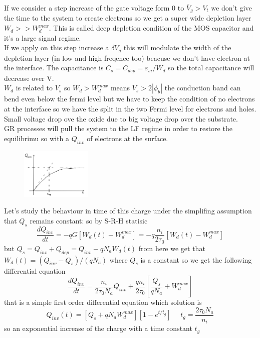 If we consider a step increase of the gate voltage form 0 to $\overline{V}_g>V_t$ we don't give the time to the system to create electrons so we get a super wide depletion layer $W_d>>W_d^{max}$. This is called deep depletion condition of the MOS capacitor and it's a large signal regime.\\
If we apply on this step increase a $\delta V_g$ this will modulate the width of the depletion layer (in low and high freqence too) beacuse we don't have electron at the interface. The capacitance is $C_s=C_{dep}=\varepsilon_{si}/W_d$ so the total capacitance will decrease over V.\\
$W_d$ is related to $V_s$ so $W_d>W_d^{max}$ means $V_s>2|\phi_b|$ the conduction band can bend even below the fermi level but we have to keep the condition of no electrons at the interface so we have the split in the two Fermi level for electrons and holes. Small voltage drop ove the oxide due to big voltage drop over the substrate.\\
GR processes will pull the system to the LF regime in order to restore the equilibrimu so with a $Q_{inv}$ of electrons at the surface.\\

\begin{figure}
\includegraphics[width=0.3\textwidth]{qinv.png}
\end{figure}

Let's study the behaviour in time of this charge under the simplifing assumption that $Q_s$ remains constant: so by S-R-H statisic 
\begin{equation}
\frac{dQ_{inv}}{dt}=-qG[W_d(t)-W_d^{max}]=-q \frac{n_i}{2\tau_0}[W_d(t)-W_d^{max}]
\end{equation}
but $Q_s=Q_{inv}+Q_{dep}=Q_{inv}-qN_aW_d(t)$ from here we get that $W_d(t)=(Q_{inv}-Q_s)/(qN_a)$ where $Q_s$ is a constant so we get the following differential equation
\begin{equation}
\frac{dQ_{inv}}{dt}=\frac{n_i}{2\tau_0N_a}Q_{inv}+\frac{qn_i}{2\tau_0}[\frac{Q_s}{qN_a}+W_d^{max}]
\end{equation}
that is a simple first order differential equation which solution is
\begin{equation}
Q_{inv}(t)=[Q_s+qN_aW_d^{max}][1-e^{t/t_g}] \ \ \ \ \ \ t_g=\frac{2\tau_0N_a}{n_i}
\end{equation}
so an exponential increase of the charge with a time constant $t_g$

